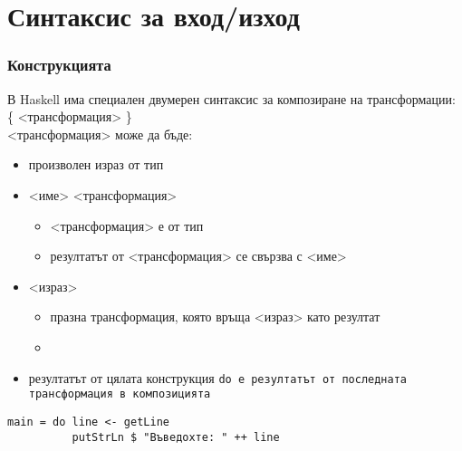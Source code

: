 \documentclass[alsotrans,beameroptions={aspectratio=169}]{beamerswitch}
\begin{document}
\section{Синтаксис за вход/изход}

\begin{frame}[fragile]
  \frametitle{Конструкцията }

  В Haskell има специален \alert{двумерен} синтаксис за композиране на трансформации:\\[1ex]
   \{ <трансформация> \}\\[1ex]
  \pause
  <трансформация> може да бъде:
  \begin{itemize}[<+->]
  \item произволен израз от тип 
  \item{} <име> \tta{<-} <трансформация>
    \begin{itemize}
    \item{} <трансформация> е от тип 
    \item резултатът от <трансформация> се свързва с <име>
    \end{itemize}
  \item {} <израз>
    \begin{itemize}
    \item празна трансформация, която връща <израз> като резултат
    \item {}
    \end{itemize}
  \item резултатът от цялата конструкция \tt{do} е резултатът от последната трансформация в композицията
  \end{itemize}
  \onslide<+->
  \vspace{-.5ex}
\begin{lstlisting}
main = do line <- getLine
          putStrLn $ "Въведохте: " ++ line
\end{lstlisting}
\end{frame}
\end{document}
